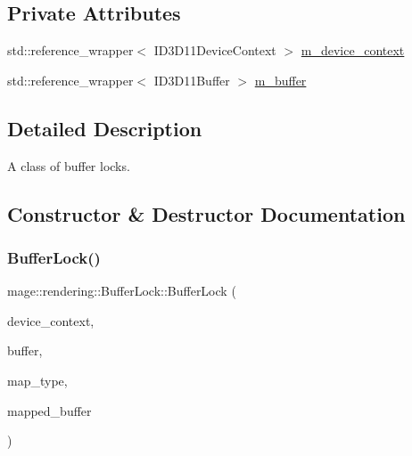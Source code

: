 \subsection*{Private Attributes}
\begin{DoxyCompactItemize}
\item 
std\+::reference\+\_\+wrapper$<$ I\+D3\+D11\+Device\+Context $>$ \hyperlink{classmage_1_1rendering_1_1_buffer_lock_afa41d2028ffcffd11f7e17ae505d1e93}{m\+\_\+device\+\_\+context}
\item 
std\+::reference\+\_\+wrapper$<$ I\+D3\+D11\+Buffer $>$ \hyperlink{classmage_1_1rendering_1_1_buffer_lock_ae3e40fcda48227f62eb63611cad1a507}{m\+\_\+buffer}
\end{DoxyCompactItemize}


\subsection{Detailed Description}
A class of buffer locks. 

\subsection{Constructor \& Destructor Documentation}
\hypertarget{classmage_1_1rendering_1_1_buffer_lock_a548c15e53e0903471268c83f16126f43}{}\label{classmage_1_1rendering_1_1_buffer_lock_a548c15e53e0903471268c83f16126f43} 
\subsubsection{\texorpdfstring{Buffer\+Lock()}{BufferLock()}\hspace{0.1cm}{\footnotesize\ttfamily [1/3]}}
{\footnotesize\ttfamily mage\+::rendering\+::\+Buffer\+Lock\+::\+Buffer\+Lock (\begin{DoxyParamCaption}\item[{I\+D3\+D11\+Device\+Context \&}]{device\+\_\+context,  }\item[{I\+D3\+D11\+Buffer \&}]{buffer,  }\item[{D3\+D11\+\_\+\+M\+AP}]{map\+\_\+type,  }\item[{D3\+D11\+\_\+\+M\+A\+P\+P\+E\+D\+\_\+\+S\+U\+B\+R\+E\+S\+O\+U\+R\+CE \&}]{mapped\+\_\+buffer }\end{DoxyParamCaption})\hspace{0.3cm}{\ttfamily [explicit]}}

